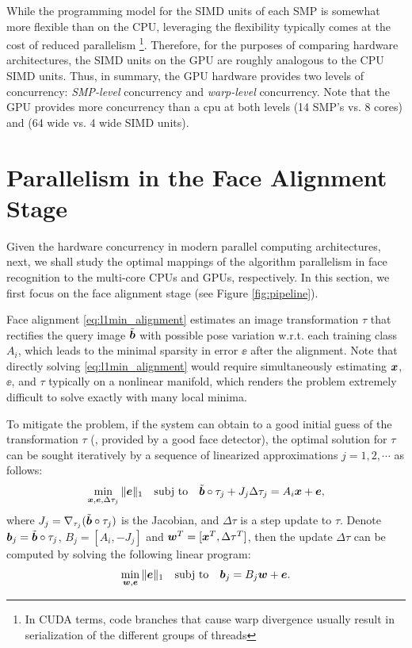 \documentclass[10pt,twocolumn,letterpaper]{article}
\begin{document}
While the programming model for
the SIMD units of each SMP is somewhat more flexible than on the CPU,
leveraging the flexibility typically comes at the cost of reduced parallelism
\footnote{In CUDA terms, code branches that cause warp divergence usually
result in serialization of the different groups of threads}.  Therefore, for
the purposes of comparing hardware architectures, the SIMD units on the GPU are
roughly analogous to the CPU SIMD units. Thus, in summary, the GPU hardware 
provides two levels of concurrency: {\em SMP-level}
concurrency and {\em warp-level} concurrency.  Note that the GPU provides more
concurrency than a cpu at both levels (14 SMP's vs. 8 cores) and (64 wide vs. 4 wide SIMD
units).

\section{Parallelism in the Face Alignment Stage}
\label{sec:alignment}

Given the hardware concurrency in modern parallel computing architectures, next,
we shall study the optimal mappings of the algorithm parallelism in face recognition to the multi-core CPUs and GPUs, respectively.
In this section, we first focus on the face alignment stage (see Figure \ref{fig:pipeline}).

Face alignment \eqref{eq:l1min_alignment} estimates an image transformation $\tau$ that rectifies the query image $\tilde{{\boldsymbol{b}}}$ with possible pose variation
w.r.t. each training class $A_i$, which leads to the minimal sparsity in error $\ee$ after the alignment. Note that directly solving \eqref{eq:l1min_alignment} would require
simultaneously estimating ${\boldsymbol{x}}$, $\ee$, and $\tau$ typically on a nonlinear manifold, which renders the problem extremely difficult to solve exactly with many local minima.

To mitigate the problem, if the system can obtain to a good initial guess of the transformation $\tau$ (\eg, provided by a good face detector),
the optimal solution for $\tau$ can be sought iteratively by a sequence of linearized approximations $j=1, 2, \cdots$ as follows:
\begin{equation}
\min_{{\boldsymbol{x}}, {\boldsymbol{e}}, \Delta \tau_j}\|{\boldsymbol{e}}\|_1\quad \textup{subj to}\quad \tilde{{\boldsymbol{b}}}\circ\tau_j +  J_j\Delta \tau_j = A_i{\boldsymbol{x}} + {\boldsymbol{e}},
\end{equation}
where $J_j = \nabla_{\tau_j}(\tilde{{\boldsymbol{b}}}\circ\tau_j)$ is the Jacobian, and
$\Delta \tau$ is a step update to $\tau$. Denote ${\boldsymbol{b}}_j =
\tilde{{\boldsymbol{b}}}\circ\tau_j$, $B_j = [A_i, -J_j]$ and ${\boldsymbol{w}}^T = [{\boldsymbol{x}}^T, \Delta
\tau^T]$, then the update $\Delta \tau$ can be computed by solving the
following linear program:
\begin{equation}
\min_{{\boldsymbol{w}}, {\boldsymbol{e}}}\|{\boldsymbol{e}}\|_1\quad \textup{subj to}\quad {\boldsymbol{b}}_j = B_j{\boldsymbol{w}} + {\boldsymbol{e}}.
\label{eq:alignment-linearization}
\end{equation}
\end{document}

